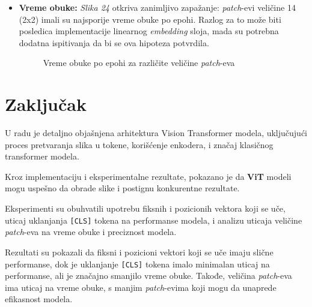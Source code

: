 \documentclass[12pt]{article}
\begin{document}
\begin{itemize}
      \newpage
      \item \textbf{Vreme obuke:} \textit{Slika 24} otkriva zanimljivo zapažanje: 
      \textit{patch}-evi veličine 14 (2x2) imali su najsporije vreme obuke po epohi. 
      Razlog za to može biti posledica implementacije linearnog \textit{embedding} sloja, 
      mada su potrebna dodatna ispitivanja da bi se ova hipoteza potvrdila.
      \begin{figure}[h!]
         \centering
         \caption{Vreme obuke po epohi za različite veličine \textit{patch}-eva}
         \label{fig:exp3_time}
      \end{figure}
   \end{itemize}
   \newpage
   \section{Zaključak}

   U radu je detaljno objašnjena arhitektura Vision Transformer modela, uključujući 
   proces pretvaranja slika u tokene, korišćenje enkodera, i značaj klasičnog 
   transformer modela.

   Kroz implementaciju i eksperimentalne rezultate, pokazano je da \textbf{ViT} modeli 
   mogu uspešno da obrade slike i postignu konkurentne rezultate.

   Eksperimenti su obuhvatili upotrebu fiksnih i pozicionih vektora koji se uče, 
   uticaj uklanjanja \texttt{[CLS]} tokena na performanse modela, i analizu uticaja 
   veličine \textit{patch}-eva na vreme obuke i preciznost modela.

   Rezultati su pokazali da fiksni i pozicioni vektori koji se uče imaju slične 
   performanse, dok je uklanjanje \texttt{[CLS]} tokena imalo minimalan uticaj na 
   performanse, ali je značajno smanjilo vreme obuke. Takođe, veličina \textit{patch}-eva 
   ima uticaj na vreme obuke, s manjim \textit{patch}-evima koji mogu da 
   unaprede efikasnost modela.

   \newpage
   \printbibliography[title={Literatura}]
\end{document}
